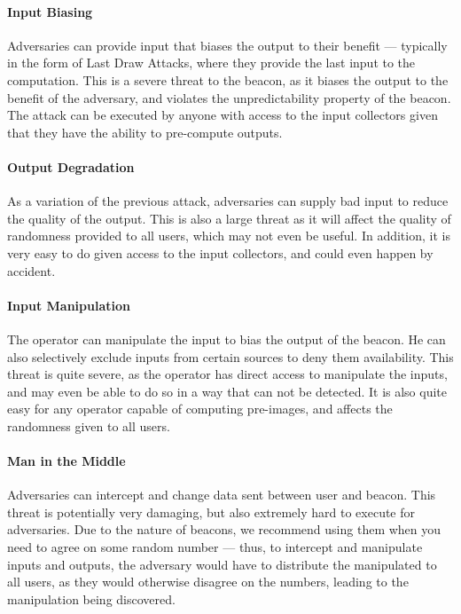 \paragraph{Input Biasing} Adversaries can provide input that biases the output to their benefit --- typically in the form of Last Draw Attacks, where they provide the last input to the computation. This is a severe threat to the beacon, as it biases the output to the benefit of the adversary, and violates the unpredictability property of the beacon. The attack can be executed by anyone with access to the input collectors given that they have the ability to pre-compute outputs.
\paragraph{Output Degradation} As a variation of the previous attack, adversaries can supply bad input to reduce the quality of the output. This is also a large threat as it will affect the quality of randomness provided to all users, which may not even be useful. In addition, it is very easy to do given access to the input collectors, and could even happen by accident.
\paragraph{Input Manipulation} The operator can manipulate the input to bias the output of the beacon. He can also selectively exclude inputs from certain sources to deny them availability. This threat is quite severe, as the operator has direct access to manipulate the inputs, and may even be able to do so in a way that can not be detected. It is also quite easy for any operator capable of computing pre-images, and affects the randomness given to all users.
\paragraph{Man in the Middle} Adversaries can intercept and change data sent between user and beacon. This threat is potentially very damaging, but also extremely hard to execute for adversaries. Due to the nature of beacons, we recommend using them when you need to agree on some random number --- thus, to intercept and manipulate inputs and outputs, the adversary would have to distribute the manipulated to all users, as they would otherwise disagree on the numbers, leading to the manipulation being discovered.
